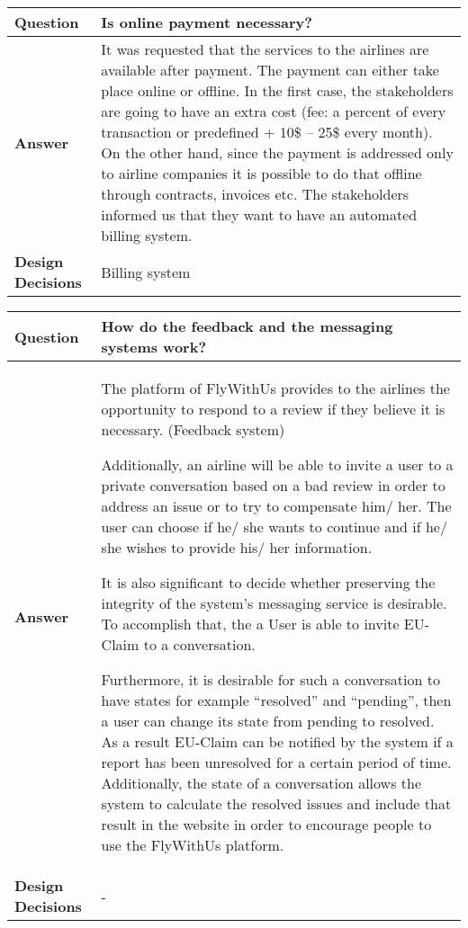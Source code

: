 \begin{longtable}{| l |  p{12cm} |}
\hline
\textbf{Question} & \textbf{Is online payment necessary?} \\ \hline
\textbf{Answer} &
	 It was requested that the services to the airlines are available after payment. The payment can either take place online or offline. In the first case, 
	the stakeholders are going to have an extra cost (fee: a percent of every transaction or predefined + 10\$ – 25\$ every month). On the other hand, since the 
	payment is addressed only to airline companies it is possible to do that offline through contracts, invoices etc.
	The stakeholders informed us that they want to have an automated billing system. \\ \hline
\textbf{Design Decisions} & Billing system \\ \hline
\end{longtable}

\begin{longtable}{| l |  p{12cm} |}
\hline
\textbf{Question} & \textbf{How do the feedback and the messaging systems work?} \\ \hline
\textbf{Answer} &
	The platform of FlyWithUs provides to the airlines the opportunity to respond to a review if they believe it is necessary. (Feedback system)\newline

	Additionally, an airline will be able to invite a user to a private conversation based on a bad review in order to address an issue or to try to compensate him/ her. The user can choose 
	if he/ she wants to continue and if he/ she wishes to provide his/ her information. \newline

	It is also significant to decide whether preserving the integrity of the system's messaging service is desirable. To accomplish that, the a User is able to invite EU-Claim to a conversation. \newline

	Furthermore, it is desirable for such a conversation to have states for example “resolved” and “pending”, then a user can change its state from pending to resolved. As a result 
	EU-Claim can be notified by the system if a report has been unresolved for a certain period of time. Additionally, the state of a conversation allows the system to calculate the resolved 
	issues and include that result in the website in order to encourage people to use the FlyWithUs platform. \\ \hline
\textbf{Design Decisions} & - \\ \hline
\end{longtable}

